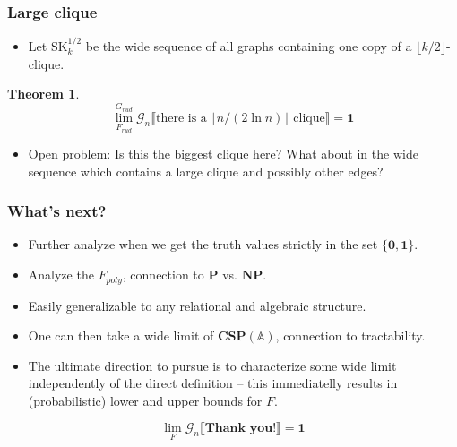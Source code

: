 \documentclass{beamer}
\newcommand{\bbl}{\llbracket}
\newcommand{\bbr}{\rrbracket}
\newcommand{\G}{\mathcal{G}}
\newcommand{\0}{\textbf{0}}
\newcommand{\1}{\textbf{1}}
\newcommand{\SK}{\text{SK}}
\newtheorem{thrm}{Theorem}
\begin{document}
\begin{frame}
\frametitle{Large clique}
\begin{itemize}
\item Let $\SK_k^{1/2}$ be the wide sequence of all graphs containing one copy of a $\lfloor k/2\rfloor$-clique.
\end{itemize}
\pause
\begin{thrm}
\[\lim_{F_{rud}}^{G_{rud}}\G_n\bbl\text{there is a $\lfloor n/(2\ln n) \rfloor$ clique}\bbr=\1\]
\end{thrm}
\pause
\begin{itemize}
\item Open problem: Is this the biggest clique here? What about in the wide sequence which contains a large clique and possibly other edges?
\end{itemize}
\end{frame}

\begin{frame}
\frametitle{What's next?}
\begin{itemize}[<+->]
\item Further analyze when we get the truth values strictly in the set $\{\0,\1\}$.
\item Analyze the $F_{poly}$, connection to $\textbf{P}$ vs. $\textbf{NP}$.
\item Easily generalizable to any relational and algebraic structure.
\item One can then take a wide limit of $\textbf{CSP}(\mathbb{A})$, connection to tractability.
\item The ultimate direction to pursue is to characterize some wide limit independently of the direct definition -- this immediatelly results in (probabilistic) lower and upper bounds for $F$.
\end{itemize}
\end{frame}

\begin{frame}
\begin{center}
\Huge
\[\lim_{F}\G_n\bbl\textbf{Thank you!}\bbr=\1\]
\end{center}
\end{frame}
\end{document}
